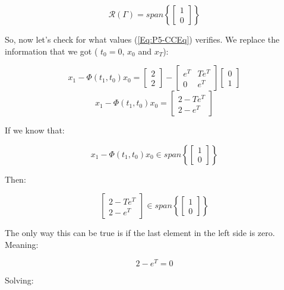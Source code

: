 \documentclass[10pt,a4paper]{article}
\begin{document}
\[ \mathcal{R}(\Gamma) = 
span
\left \{
\begin{bmatrix}
1 \\
0
\end{bmatrix}
\right \}
\]

So, now let's check for what values (\ref{Eq:P5-CCEq}) verifies. We replace the information that we got ( $t_{0} = 0$, $x_{0}$ and $x_{T}$):

\[
x_{1} - \Phi(t_{1}, t_{0})x_{0} =
\begin{bmatrix}
2 \\
2
\end{bmatrix}
- 
\begin{bmatrix}
e^{T} & Te^{T} \\
0 & e^{T}
\end{bmatrix}
\begin{bmatrix}
0 \\
1
\end{bmatrix} \]
\[ 
x_{1} - \Phi(t_{1}, t_{0})x_{0}
=
\begin{bmatrix}
2 - Te^{T}\\
2 - e^{T}
\end{bmatrix}
\]


If we know that:

\[ 
x_{1} - \Phi(t_{1}, t_{0})x_{0}
 \in 
span
\left \{
\begin{bmatrix}
1 \\
0
\end{bmatrix}
\right \}
\]

Then: 

\[ 
\begin{bmatrix}
2 - Te^{T}\\
2 - e^{T}
\end{bmatrix}
\in 
span
\left \{
\begin{bmatrix}
1 \\
0
\end{bmatrix}
\right \}
\]

The only way this can be true is if the last element in the left side is zero. Meaning:

\[  2 - e^{T} = 0 \]

Solving:
\begin{center}
\end{center}
\end{document}
